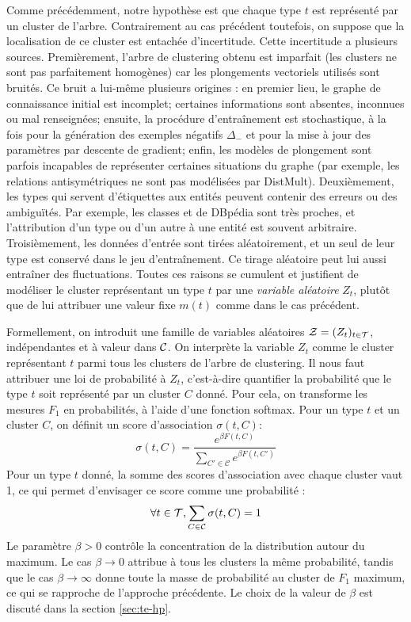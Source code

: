 Comme précédemment, notre hypothèse est que chaque type $t$ est représenté par un cluster de l'arbre. Contrairement au cas précédent toutefois, on suppose que la localisation de ce cluster est entachée d'incertitude. Cette incertitude a plusieurs sources. Premièrement, l'arbre de clustering obtenu est imparfait (les clusters ne sont pas parfaitement homogènes) car les plongements vectoriels utilisés sont bruités. Ce bruit a lui-même plusieurs origines : en premier lieu, le graphe de connaissance initial est incomplet; certaines informations sont absentes, inconnues ou mal renseignées; ensuite, la procédure d'entraînement est stochastique, à la fois pour la génération des exemples négatifs $\Delta_-$ et pour la mise à jour des paramètres par descente de gradient; enfin, les modèles de plongement sont parfois incapables de représenter certaines situations du graphe (par exemple, les relations antisymétriques ne sont pas modélisées par DistMult). Deuxièmement, les types qui servent d'étiquettes aux entités peuvent contenir des erreurs ou des ambiguïtés. Par exemple, les classes  et  de DBpédia sont très proches, et l'attribution d'un type ou d'un autre à une entité est souvent arbitraire. Troisièmement, les données d'entrée sont tirées aléatoirement, et un seul de leur type est conservé dans le jeu d'entraînement. Ce tirage aléatoire peut lui aussi entraîner des fluctuations. Toutes ces raisons se cumulent et justifient de modéliser le cluster représentant un type $t$ par une \textit{variable aléatoire} $Z_t$, plutôt que de lui attribuer une valeur fixe $m(t)$ comme dans le cas précédent.

Formellement, on introduit une famille de variables aléatoires $\cal{Z} = (Z_t)_{t \in \Types}$, indépendantes et à valeur dans $\Clusters$. On interprète la variable $Z_t$ comme le cluster représentant $t$ parmi tous les clusters de l'arbre de clustering. Il nous faut attribuer une loi de probabilité à $Z_t$, c'est-à-dire quantifier la probabilité que le type $t$ soit représenté par un cluster $C$ donné. Pour cela, on transforme les mesures $F_1$ en probabilités, à l'aide d'une fonction softmax. Pour un type $t$ et un cluster $C$, on définit un score d'association $\sigma(t, C)$:
\begin{equation}
    \sigma(t, C) = \frac{\displaystyle e^{ \beta F(t, C)}}{\displaystyle \sum_{C' \in \mathcal{C}} e^{\beta F(t, C')}}
\end{equation}
Pour un type $t$ donné, la somme des scores d'association avec chaque cluster vaut 1, ce qui permet d'envisager ce score comme une probabilité :
\begin{equation}
    \forall t \in \cal{T}, \sum_{C \in \cal{C}} \sigma(t, C) = 1
\end{equation}
Le paramètre $\beta > 0$ contrôle la concentration de la distribution autour du maximum. Le cas $\beta \rightarrow 0$ attribue à tous les clusters la même probabilité, tandis que le cas $\beta \rightarrow \infty$ donne toute la masse de probabilité au cluster de $F_1$ maximum, ce qui se rapproche de l'approche précédente. Le choix de la valeur de $\beta$ est discuté dans la section \ref{sec:te-hp}.

